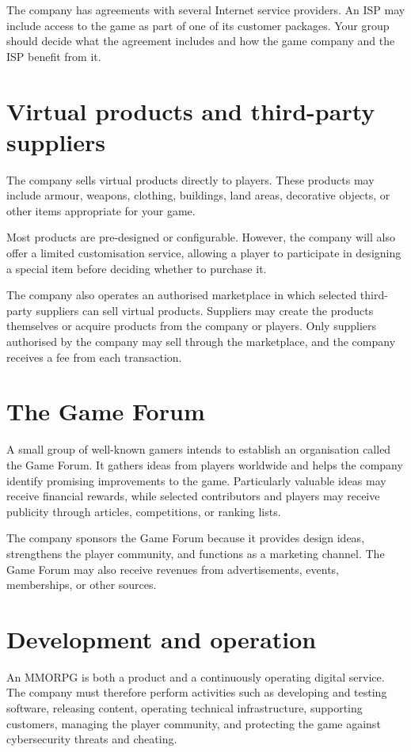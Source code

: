 \documentclass[12pt,a4paper]{article}
\begin{document}
The company has agreements with several Internet service providers. An ISP may include access to the game as part of one of its
customer packages. Your group should decide what the agreement includes and how the game company and the ISP benefit from it.

\section*{Virtual products and third-party suppliers}

The company sells virtual products directly to players. These products may include armour, weapons, clothing, buildings, land areas,
decorative objects, or other items appropriate for your game.

Most products are pre-designed or configurable. However, the company will also offer a limited customisation service, allowing a
player to participate in designing a special item before deciding whether to purchase it.

The company also operates an authorised marketplace in which selected third-party suppliers can sell virtual products. Suppliers may
create the products themselves or acquire products from the company or players. Only suppliers authorised by the company may sell
through the marketplace, and the company receives a fee from each transaction.

\section*{The Game Forum}

A small group of well-known gamers intends to establish an organisation called the Game Forum. It gathers ideas from players
worldwide and helps the company identify promising improvements to the game. Particularly valuable ideas may receive financial
rewards, while selected contributors and players may receive publicity through articles, competitions, or ranking lists.

The company sponsors the Game Forum because it provides design ideas, strengthens the player community, and functions as a marketing
channel. The Game Forum may also receive revenues from advertisements, events, memberships, or other sources.

\section*{Development and operation}

An MMORPG is both a product and a continuously operating digital service. The company must therefore perform activities such as
developing and testing software, releasing content, operating technical infrastructure, supporting customers, managing the player
community, and protecting the game against cybersecurity threats and cheating.
\end{document}
